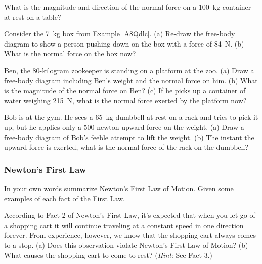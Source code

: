 \documentclass[main.tex]{subfiles}
\begin{document}
\begin{exercise} \label{QaZUiq}
What is the magnitude and direction of the normal force on a \SI{100}{kg} container at rest on a table?
\end{exercise}

\begin{exercise} \label{wkga6W}
Consider the \SI{7}{kg} box from Example \ref{A8Qdlc}. (a) Re-draw the free-body diagram to show a person pushing down on the box with a force of \SI{84}{N}. (b) What is the normal force on the box now?
\end{exercise}

\begin{exercise} \label{hIgPqQ}
Ben, the 80-kilogram zookeeper is standing on a platform at the zoo. (a) Draw a free-body diagram including Ben's weight and the normal force on him. (b) What is the magnitude of the normal force on Ben? (c) If he picks up a container of water weighing \SI{215}{N}, what is the normal force exerted by the platform now? 
\end{exercise}

\begin{exercise} \label{SwLQsz}
    Bob is at the gym. He sees a \SI{65}{kg} dumbbell at rest on a rack and tries to pick it up, but he applies only a 500-newton upward force on the weight. (a) Draw a free-body diagram of Bob's feeble attempt to lift the weight. (b) The instant the upward force is exerted, what is the normal force of the rack on the dumbbell?
\end{exercise}

\subsubsection*{Newton's First Law}

\begin{exercise} \label{prob:fgm}
In your own words summarize Newton's First Law of Motion. Given some examples of each fact of the First Law. 
\end{exercise}


\begin{exercise} \label{WTFwXI}
According to Fact 2 of Newton's First Law, it's expected that when you let go of a shopping cart it will continue traveling at a constant speed in one direction forever. From experience, however, we know that the shopping cart always comes to a stop. (a) Does this observation violate Newton's First Law of Motion? (b) What causes the shopping cart to come to rest? (\textit{Hint}: See Fact 3.)
\end{exercise}
\end{document}

